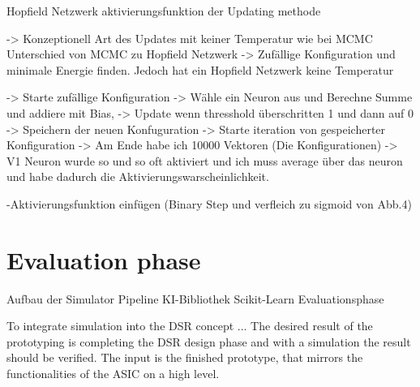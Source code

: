 Hopfield Netzwerk aktivierungsfunktion der Updating methode

-> Konzeptionell Art des Updates mit keiner Temperatur wie bei MCMC 
Unterschied von MCMC zu Hopfield Netzwerk -> Zufällige Konfiguration und minimale Energie finden. Jedoch hat ein Hopfield
Netzwerk keine Temperatur 

-> Starte zufällige Konfiguration
-> Wähle ein Neuron aus und Berechne Summe und addiere mit Bias, 
-> Update wenn thresshold überschritten 1 und dann auf 0 
-> Speichern der neuen Konfuguration 
-> Starte iteration von gespeicherter Konfiguration 
-> Am Ende habe ich 10000 Vektoren (Die Konfigurationen) -> V1 Neuron wurde so und so oft aktiviert und ich muss average
über das neuron und habe dadurch die Aktivierungswarscheinlichkeit.

-Aktivierungsfunktion einfügen (Binary Step und verfleich zu sigmoid von Abb.4)



\section{Evaluation phase}

Aufbau der Simulator Pipeline
KI-Bibliothek Scikit-Learn
Evaluationsphase

To integrate simulation into the DSR concept ... 
The desired result of the prototyping is completing the \ac{DSR} design phase and with a simulation the result should be verified.
The input is the finished prototype, that mirrors the functionalities of the \ac{ASIC} on a high level.
